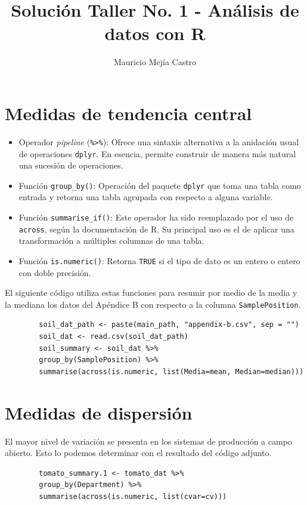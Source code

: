 \documentclass[11pt,letterpaper]{article}
\author{Mauricio Mejía Castro}
\title{Solución Taller No. 1 - Análisis de datos con R}
\begin{document}
	\maketitle
	\section{Medidas de tendencia central}
	
	\begin{itemize}
		\item Operador {\em pipeline} ({\tt \%>\%}): Ofrece una sintaxis alternativa a la anidación usual de operaciones {\tt dplyr}. En esencia, permite construir de manera más natural una sucesión de operaciones.
		\item Función {\tt group\_by()}: Operación del paquete {\tt dplyr} que toma una tabla como entrada y retorna una tabla agrupada con respecto a alguna variable.
		\item Función {\tt summarise\_if()}: Este operador ha sido reemplazado por el uso de {\tt across}, según la documentación de R. Su principal uso es el de aplicar una transformación a múltiples columnas de una tabla.
		\item Función {\tt is.numeric()}: Retorna {\tt TRUE} si el tipo de dato es un entero o entero con doble precisión.
	\end{itemize}

	El siguiente código utiliza estas funciones para resumir por medio de la media y la mediana los datos del Apéndice B con respecto a la columna {\tt SamplePosition}.
	
	\begin{verbatim}
		soil_dat_path <- paste(main_path, "appendix-b.csv", sep = "")
		soil_dat <- read.csv(soil_dat_path)
		soil_summary <- soil_dat %>% 
		group_by(SamplePosition) %>% 
		summarise(across(is.numeric, list(Media=mean, Median=median))) 
	\end{verbatim}

	\section{Medidas de dispersión}
	
	El mayor nivel de variación se presenta en los sistemas de producción a campo abierto. Esto lo podemos determinar con el resultado del código adjunto.
	
	\begin{verbatim}
		tomato_summary.1 <- tomato_dat %>% 
		group_by(Department) %>% 
		summarise(across(is.numeric, list(cvar=cv))) 
	\end{verbatim}
\end{document}
